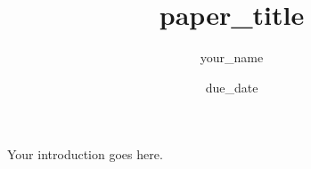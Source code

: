 \documentclass{turabian-researchpaper}
\title{{{paper_title}}}
\author{{{your_name}}}
\date{{{due_date}}}
\begin{document}
\maketitle


Your introduction goes here.

\end{document}
